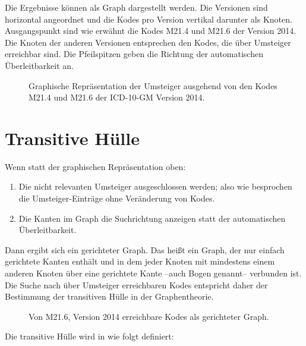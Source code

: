 Die Ergebnisse können als Graph dargestellt werden. Die Versionen sind horizontal angeordnet und die Kodes pro Version vertikal darunter als Knoten. Ausgangspunkt sind wie erwähnt die Kodes M21.4 und M21.6 der Version 2014. Die Knoten der anderen Versionen entsprechen den Kodes, die über Umsteiger erreichbar sind. Die Pfeilspitzen geben die Richtung der automatischen Überleitbarkeit an. 

\begin{figure}[H]
    \centering\Large%
    \resizebox{.99\linewidth}{!}{}
    \normalsize\caption{Graphische Repräsentation der Umsteiger ausgehend von den Kodes M21.4 und M21.6 der ICD-10-GM Version 2014.}
\end{figure}

\section{Transitive Hülle}

Wenn statt der graphischen Repräsentation oben:

\begin{enumerate}
\item Die nicht relevanten Umsteiger ausgeschlossen werden; also wie besprochen die Umsteiger-Einträge ohne Veränderung von Kodes.
\item Die Kanten im Graph die Suchrichtung anzeigen statt der automatischen Überleitbarkeit.
\end{enumerate}

Dann ergibt sich ein gerichteter Graph. Das heißt ein Graph, der nur einfach gerichtete Kanten enthält und in dem jeder Knoten mit mindestens einem anderen Knoten über eine gerichtete Kante --auch Bogen genannt-- verbunden ist. Die Suche nach über Umsteiger erreichbaren Kodes entspricht daher der Bestimmung der transitiven Hülle in der Graphentheorie. 

\begin{figure}[H]
    \centering\Large%
    \resizebox{.99\linewidth}{!}{}
    \normalsize\caption{Von M21.6, Version 2014 erreichbare Kodes als gerichteter Graph.}
    \label{img-m21-6}
\end{figure}

Die transitive Hülle wird in \cite[Seite 172]{gross2013handbook} wie folgt definiert: 

\begin{figure}[H]
    \centering
    \setlength{\fboxsep}{10pt}\color{black!20}
    \normalcolor%
\end{figure}

